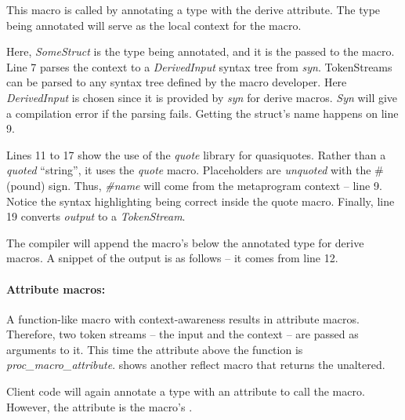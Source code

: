 This macro is called by annotating a type with the derive attribute.
The type being annotated will serve as the local context for the macro.


Here, \textit{SomeStruct} is the type being annotated, and it is the  passed to the macro.
Line 7 parses the context to a \textit{DerivedInput} syntax tree from \textit{syn}.
TokenStreams can be parsed to any syntax tree defined by the macro developer.
Here \textit{DerivedInput} is chosen since it is provided by \textit{syn} for derive macros.
\textit{Syn} will give a compilation error if the parsing fails.
Getting the struct's name happens on line 9.

Lines 11 to 17 show the use of the \textit{quote} library for quasiquotes.
Rather than a \textit{quoted} ``string'', it uses the \textit{quote} macro.
Placeholders are \textit{unquoted} with the \# (pound) sign.
Thus, \textit{\#name} will come from the metaprogram context -- line 9.
Notice the syntax highlighting being correct inside the quote macro.
Finally, line 19 converts \textit{output} to a \textit{TokenStream}.

The compiler will append the macro's  below the annotated type for derive macros.
A snippet of the output is as follows -- it comes from line 12.


\paragraph{Attribute macros:}
\label{sec:attribute-macro}
A function-like macro with context-awareness results in attribute macros.
Therefore, two token streams -- the input and the context -- are passed as arguments to it.
This time the attribute above the function is \textit{proc\_macro\_attribute}.
 shows another reflect macro that returns the  unaltered.


Client code will again annotate a type with an attribute to call the macro.
However, the attribute is the macro's .

